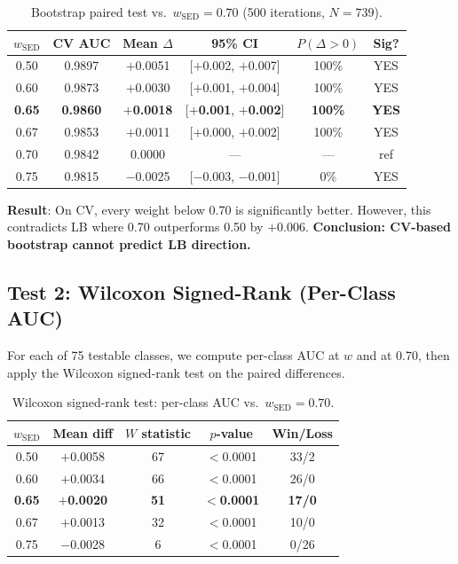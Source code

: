 \documentclass[a4paper,11pt]{article}
\begin{document}
\begin{table}[h]
\centering
\caption{Bootstrap paired test vs.\ $w_\text{SED}=0.70$ (500 iterations, $N=739$).}
\small
\begin{tabular}{cccccc}
\toprule
$w_\text{SED}$ & CV AUC & Mean $\Delta$ & 95\% CI & $P(\Delta>0)$ & Sig? \\
\midrule
0.50 & 0.9897 & $+$0.0051 & [$+$0.002, $+$0.007] & 100\% & YES \\
0.60 & 0.9873 & $+$0.0030 & [$+$0.001, $+$0.004] & 100\% & YES \\
\textbf{0.65} & \textbf{0.9860} & $+$\textbf{0.0018} & [$+$\textbf{0.001}, $+$\textbf{0.002}] & \textbf{100\%} & \textbf{YES} \\
0.67 & 0.9853 & $+$0.0011 & [$+$0.000, $+$0.002] & 100\% & YES \\
0.70 & 0.9842 & 0.0000 & --- & --- & ref \\
0.75 & 0.9815 & $-$0.0025 & [$-$0.003, $-$0.001] & 0\% & YES \\
\bottomrule
\end{tabular}
\label{tab:bootstrap}
\end{table}

\textbf{Result}: On CV, every weight below 0.70 is significantly better. However, this contradicts LB where 0.70 outperforms 0.50 by $+$0.006. \textbf{Conclusion: CV-based bootstrap cannot predict LB direction.}

\subsection{Test 2: Wilcoxon Signed-Rank (Per-Class AUC)}

For each of 75 testable classes, we compute per-class AUC at $w$ and at 0.70, then apply the Wilcoxon signed-rank test on the paired differences.

\begin{table}[h]
\centering
\caption{Wilcoxon signed-rank test: per-class AUC vs.\ $w_\text{SED}=0.70$.}
\small
\begin{tabular}{ccccc}
\toprule
$w_\text{SED}$ & Mean diff & $W$ statistic & $p$-value & Win/Loss \\
\midrule
0.50 & $+$0.0058 & 67 & $<$0.0001 & 33/2 \\
0.60 & $+$0.0034 & 66 & $<$0.0001 & 26/0 \\
\textbf{0.65} & $+$\textbf{0.0020} & \textbf{51} & $<$\textbf{0.0001} & \textbf{17/0} \\
0.67 & $+$0.0013 & 32 & $<$0.0001 & 10/0 \\
0.75 & $-$0.0028 & 6 & $<$0.0001 & 0/26 \\
\bottomrule
\end{tabular}
\label{tab:wilcoxon}
\end{table}
\end{document}
